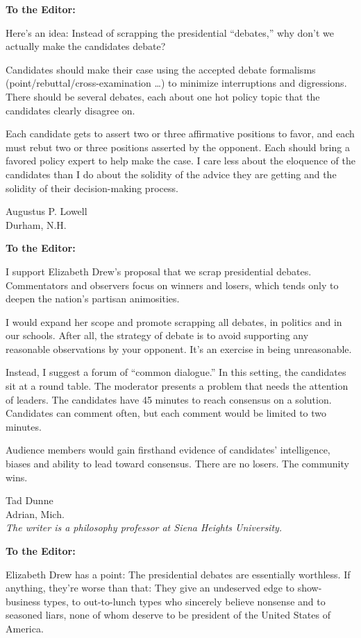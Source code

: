 \textbf{To the Editor:}

Here's an idea: Instead of scrapping the presidential ``debates,'' why
don't we actually make the candidates debate?

Candidates should make their case using the accepted debate formalisms
(point/rebuttal/cross-examination \ldots) to minimize interruptions and
digressions. There should be several debates, each about one hot policy
topic that the candidates clearly disagree on.

Each candidate gets to assert two or three affirmative positions to
favor, and each must rebut two or three positions asserted by the
opponent. Each should bring a favored policy expert to help make the
case. I care less about the eloquence of the candidates than I do about
the solidity of the advice they are getting and the solidity of their
decision-making process.

Augustus P. Lowell\\
Durham, N.H.

\textbf{To the Editor:}

I support Elizabeth Drew's proposal that we scrap presidential debates.
Commentators and observers focus on winners and losers, which tends only
to deepen the nation's partisan animosities.

I would expand her scope and promote scrapping all debates, in politics
and in our schools. After all, the strategy of debate is to avoid
supporting any reasonable observations by your opponent. It's an
exercise in being unreasonable.

Instead, I suggest a forum of ``common dialogue.'' In this setting, the
candidates sit at a round table. The moderator presents a problem that
needs the attention of leaders. The candidates have 45 minutes to reach
consensus on a solution. Candidates can comment often, but each comment
would be limited to two minutes.

Audience members would gain firsthand evidence of candidates'
intelligence, biases and ability to lead toward consensus. There are no
losers. The community wins.

Tad Dunne\\
Adrian, Mich.\\
\emph{The writer is a philosophy professor at Siena Heights University.}

\textbf{To the Editor:}

Elizabeth Drew has a point: The presidential debates are essentially
worthless. If anything, they're worse than that: They give an undeserved
edge to show-business types, to out-to-lunch types who sincerely believe
nonsense and to seasoned liars, none of whom deserve to be president of
the United States of America.

